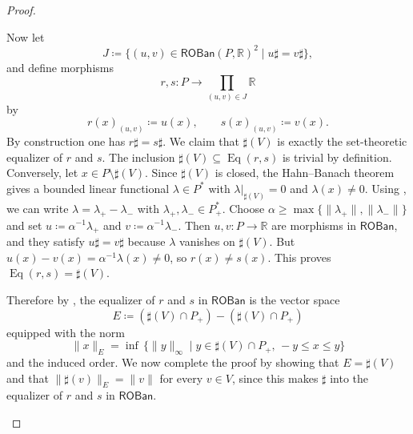 \documentclass[11pt,onecolumn]{article}
\newcommand{\R}{\mathbb{R}}
\newcommand{\ROBan}{\mathsf{ROBan}}
\theoremstyle{plain}
\theoremstyle{remark}
\theoremstyle{definition}
\begin{document}
\begin{proof}
\begin{enumerate}
			Now let
			\[
				J \coloneqq \{(u,v) \in \ROBan(P,\R)^2 \mid u \sharp = v \sharp \},
			\]
			and define morphisms
			\[
				r,s \colon P \longrightarrow \prod_{(u,v) \in J} \R
			\]
			by
			\[
				r(x)_{(u,v)} \coloneqq u(x),
				\qquad
				s(x)_{(u,v)} \coloneqq v(x).
			\]
			By construction one has $r \sharp = s \sharp$.
			We claim that $\sharp(V)$ is exactly the set-theoretic equalizer of $r$ and $s$.
			The inclusion $\sharp(V) \subseteq \operatorname{Eq}(r,s)$ is trivial by definition.
			Conversely, let $x \in P \setminus \sharp(V)$.
			Since $\sharp(V)$ is closed, the Hahn--Banach theorem gives a bounded linear functional $\lambda \in P^*$ with $\lambda|_{\sharp(V)} = 0$ and $\lambda(x) \neq 0$.
			Using \cite[Theorem~1.3]{RobinsonYamamuro}, we can write $\lambda = \lambda_+ - \lambda_-$ with $\lambda_+,\lambda_- \in P^*_+$.
			Choose $\alpha \ge \max\{\|\lambda_+\|,\|\lambda_-\|\}$ and set $u \coloneqq \alpha^{-1}\lambda_+$ and $v \coloneqq \alpha^{-1}\lambda_-$.
			Then $u,v \colon P \to \R$ are morphisms in $\ROBan$, and they satisfy $u \sharp = v \sharp$ because $\lambda$ vanishes on $\sharp(V)$.
			But $u(x) - v(x) = \alpha^{-1}\lambda(x) \neq 0$, so $r(x) \neq s(x)$.
			This proves $\operatorname{Eq}(r,s) = \sharp(V)$.

			Therefore by , the equalizer of $r$ and $s$ in $\ROBan$ is the vector space
			\[
				E \coloneqq (\sharp(V) \cap P_+) - (\sharp(V) \cap P_+)
			\]
			equipped with the norm
			\[
				\|x\|_E = \inf \, \{ \|y\|_\infty \mid y \in \sharp(V) \cap P_+,\, -y \le x \le y \}
			\]
			and the induced order.
			We now complete the proof by showing that $E = \sharp(V)$ and that $\|\sharp(v)\|_E = \|v\|$ for every $v \in V$,
			since this makes $\sharp$ into the equalizer of $r$ and $s$ in $\ROBan$.


\end{enumerate}
\end{proof}
\end{document}
